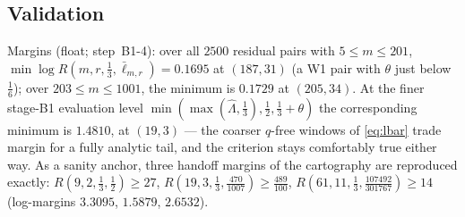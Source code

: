 \documentclass[11pt]{article}
\theoremstyle{remark}
\theoremstyle{plain}
\theoremstyle{plain}
\newcommand{\lbar}{\bar\ell}
\newcommand{\Lhat}{\widehat\Lambda}
\begin{document}
\subsection{Validation}\label{sec:valid}

Margins (float; step~B1-4): over all $2500$ residual pairs with $5\le m\le201$, $\min\log R(m,r,\tfrac13,\lbar_{m,r})=0.1695$ at $(187,31)$ (a W1 pair with $\theta$ just below $\tfrac16$); over $203\le m\le1001$, the minimum is $0.1729$ at $(205,34)$.  At the finer stage-B1 evaluation level $\min(\max(\Lhat,\tfrac13),\tfrac12,\tfrac13+\theta)$ the corresponding minimum is $1.4810$, at $(19,3)$ --- the coarser $q$-free windows of \eqref{eq:lbar} trade margin for a fully analytic tail, and the criterion stays comfortably true either way.  As a sanity anchor, three handoff margins of the cartography are reproduced exactly: $R(9,2,\tfrac13,\tfrac12)\ge27$, $R(19,3,\tfrac13,\tfrac{470}{1007})\ge\tfrac{489}{100}$, $R(61,11,\tfrac13,\tfrac{107492}{301767})\ge14$ (log-margins $3.3095$, $1.5879$, $2.6532$).
\end{document}
